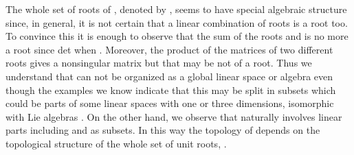 \documentclass[a4paper,12pt]{article}
\begin{document}
The whole set of roots of \coordHE{}, denoted by  \coordHE{}, seems to have 
special algebraic structure since, in general, it is not certain that a linear 
combination of roots is a root too. To convince this it is enough to observe 
that the sum of the roots \myHighlight{$\xi$}\coordHE{} and  \myHighlight{$\xi^*$}\coordHE{} is no more a root since 
det\coordHE{} when \myHighlight{$\xi^*\not=\xi$}\coordHE{}. Moreover, 
the product of the matrices of two different roots gives a nonsingular matrix 
but that may be not of a root. Thus we understand that \coordHE{} can not 
be organized as a global linear space or algebra even though the examples we 
know indicate that this may be split in subsets which could be parts of some 
linear spaces with one or three dimensions, isomorphic with Lie algebras 
\cite{CV1,K2}. On the other hand, we observe that \coordHE{} naturally 
involves linear parts including  \coordHE{} and \coordHE{} as 
subsets. In this way  the topology of \coordHE{}  depends on the 
topological structure of the whole set of unit roots, \coordHE{}. 
\end{document}
